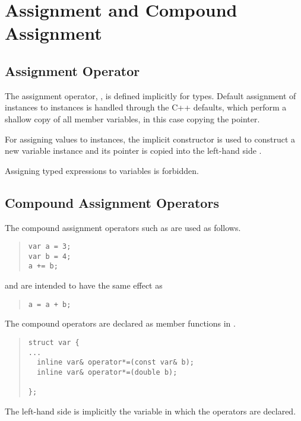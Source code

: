 \documentclass[10pt]{article}
\begin{document}
\section{Assignment and Compound Assignment}

\subsection{Assignment Operator}

The assignment operator, , is defined implicitly for
 types.  Default assignment of  instances to
 instances is handled through the C++ defaults, which
perform a shallow copy of all member variables, in this case copying
the  pointer.

For assigning  values to  instances, the
implicit constructor  is used to construct a new
variable instance and its  pointer is copied into the
left-hand side .  

Assigning  typed expressions to  variables is
forbidden.  

\subsection{Compound Assignment Operators}

The compound assignment operators such as \code{+=} are used as
follows.
%
\begin{quote}
\begin{Verbatim}
var a = 3;
var b = 4;
a += b;
\end{Verbatim}
\end{quote}
%
and are intended to have the same effect as
%
\begin{quote}
\begin{Verbatim}
a = a + b;
\end{Verbatim}
\end{quote}
%
The compound operators are declared as member functions in .
%
\begin{quote}
\begin{Verbatim}
struct var {
...
  inline var& operator*=(const var& b);
  inline var& operator*=(double b);

};
\end{Verbatim}
\end{quote}
%
The left-hand side is implicitly the variable in which the operators
are declared.
\end{document}
